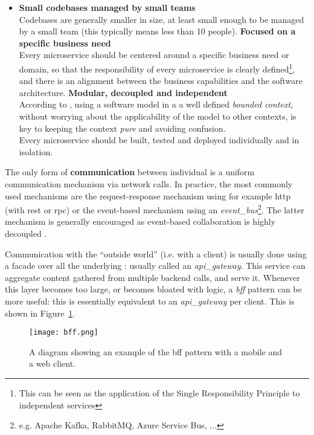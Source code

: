 \begin{itemize}
    \item \textbf{Small codebases managed by small teams}\\
    Codebases are generally smaller in size, at least small enough to be managed
    by a small team (this typically means less than 10 people).
    \spacedItem \textbf{Focused on a specific business need}\\
    Every \gls{microservice} should be centered around a specific business need
    or domain, so that the responsibility of every \gls{microservice} is clearly
    defined\footnote{This can be seen as the application of the Single
    Responsibility Principle to independent services}, and there is an alignment
    between the business capabilities and the software architecture. 
    \spacedItem \textbf{Modular, decoupled and independent}\\
    According to \textcite{Evans_2004}, using a software model in a a well
    defined \textit{bounded context}, without worrying about the applicability
    of the model to other contexts, is key to keeping the context \textit{pure}
    and avoiding confusion.\\
    Every \gls{microservice} should be built, tested and deployed
    individually and in isolation. 
\end{itemize}

The only form of \textbf{communication} between individual
 is a uniform communication mechanism via network calls.
In practice, the most commonly used mechanisms are the request-response
mechanism using for example \gls{http} (with \gls{rest} or \gls{rpc}) or the
event-based mechanism using an \textit{\gls{event_bus}}\footnote{e.g. Apache
Kafka, RabbitMQ, Azure Service Bus, ...}. The latter mechanism is generally
encouraged as event-based collaboration is highly decoupled
\autocite{Newman_2015}.

Communication with the ``outside world'' (i.e. with a client) is usually done
using a facade over all the underlying : usually called
an \textit{\gls{api_gateway}}. This service can aggregate content gathered from
multiple backend calls, and serve it. Whenever this layer becomes too large, or
becomes bloated with logic, a \textit{\gls{bff}} pattern can be more useful:
this is essentially equivalent to an \textit{\gls{api_gateway}} per client. This
is shown in Figure~\ref{fig:bff}.


\begin{figure}
    \centering
    \texttt{[image: bff.png]}
    \caption[Backend for frontend pattern]{A diagram showing an example of the
    \gls{bff} pattern with a mobile and a web client.}
    \label{fig:bff}
\end{figure}


